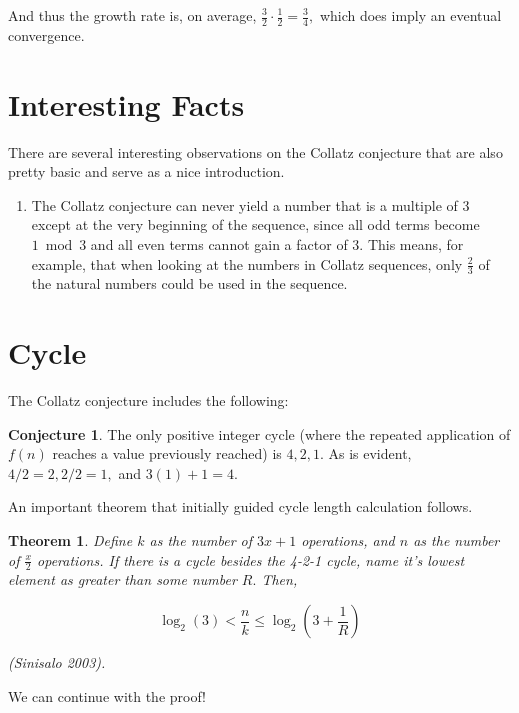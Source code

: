 \documentclass{article}
\newtheorem{theorem}{Theorem}
\theoremstyle{remark}
\theoremstyle{problem}
\numberwithin{problem}{subsection}
\numberwithin{Problem}{section}
\theoremstyle{definition}
\theoremstyle{definition}
\newtheorem{conjecture}{Conjecture}
\theoremstyle{definition}
\begin{document}
And thus the growth rate is, on average, $\frac{3}{2} \cdot \frac{1}{2} = \frac{3}{4},$ which does imply an eventual convergence. 

\section{Interesting Facts}

There are several interesting observations on the Collatz conjecture that are also pretty basic and serve as a nice introduction.

\begin{enumerate}
    \item The Collatz conjecture can never yield a number that is a multiple of 3 except at the very beginning of the sequence, since all odd terms become $1 \bmod 3$ and all even terms cannot gain a factor of $3.$ This means, for example, that when looking at the numbers in Collatz sequences, only $\frac{2}{3}$ of the natural numbers could be used in the sequence.
\end{enumerate}

\section{Cycle}

The Collatz conjecture includes the following:

\begin{conjecture}
    The only positive integer cycle (where the repeated application of $f(n)$ reaches a value previously reached) is $4, 2, 1.$ As is evident, $4/2 = 2, 2/2 = 1,$ and $3(1) + 1 = 4.$
\end{conjecture}

An important theorem that initially guided cycle length calculation follows.
\begin{theorem}
 Define $k$ as the number of $3x + 1$ operations, and $n$ as the number of $\frac{x}{2}$ operations. If there is a cycle besides the 4-2-1 cycle, name it's lowest element as greater than some number $R.$ Then,

$$ \log_{2}(3) < \frac{n}{k} \leq \log_{2} \left( 3 + \frac{1}{R} \right)$$

(Sinisalo 2003).
\end{theorem}

We can continue with the proof!
\end{document}

